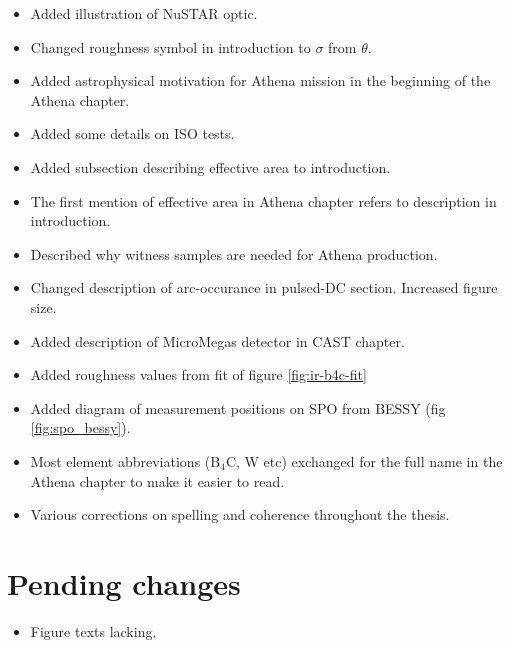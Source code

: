 \begin{itemize}
  \item Added illustration of NuSTAR optic.
  \item Changed roughness symbol in introduction to $\sigma$ from $\theta$.
  \item Added astrophysical motivation for Athena mission in the beginning of the Athena chapter.
  \item Added some details on ISO tests.
  \item Added subsection describing effective area to introduction.
  \item The first mention of effective area in Athena chapter refers to description in introduction.
  \item Described why witness samples are needed for Athena production.
  \item Changed description of arc-occurance in pulsed-DC section. Increased figure size.
  \item Added description of MicroMegas detector in CAST chapter.
  \item Added roughness values from fit of figure \ref{fig:ir-b4c-fit}
  \item Added diagram of measurement positions on SPO from BESSY (fig \ref{fig:spo_bessy}).
  \item Most element abbreviations (B$_4$C, W etc) exchanged for the full name in the Athena chapter to make it easier to read.

  \item Various corrections on spelling and coherence throughout the thesis.
\end{itemize}

\section{Pending changes}
\begin{itemize}
\item Figure texts lacking.
\end{itemize}
